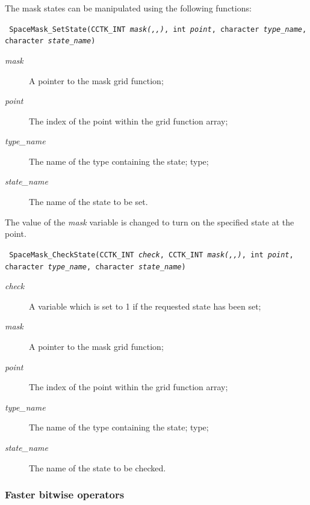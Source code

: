\documentclass{article}
\begin{document}
The mask states can be manipulated using the following functions:

\indent\parbox{\linewidth}{
\vspace{\baselineskip}\noindent\texttt{
  SpaceMask\_SetState(CCTK\_INT \emph{mask(,,)}, int \emph{point}, 
    character \emph{type\_name},\\\hspace*{10mm} character \emph{state\_name})
}\\
\hspace*{10mm}\parbox{\linewidth}{
\begin{description}
  \item[\emph{mask}] A pointer to the mask grid function;
  \item[\emph{point}] The index of the point within the grid function
    array;
  \item[\emph{type\_name}] The name of the type containing the state;
    type;
  \item[\emph{state\_name}] The name of the state to be set.
\end{description}
}}

\noindent The value of the \emph{mask} variable is changed to turn on
the specified state at the point.

\indent\parbox{\linewidth}{
\vspace{\baselineskip}\noindent\texttt{
  SpaceMask\_CheckState(CCTK\_INT \emph{check}, CCTK\_INT \emph{mask(,,)},
    int \emph{point},\\\hspace*{10mm} character \emph{type\_name},
    character \emph{state\_name})
}\\
\hspace*{10mm}\parbox{\linewidth}{
\begin{description}
  \item[\emph{check}] A variable which is set to 1 if the requested
    state has been set;
  \item[\emph{mask}] A pointer to the mask grid function;
  \item[\emph{point}] The index of the point within the grid function
    array;
  \item[\emph{type\_name}] The name of the type containing the state;
    type;
  \item[\emph{state\_name}] The name of the state to be checked.
\end{description}
}}

\subsubsection{Faster bitwise operators}
\end{document}
